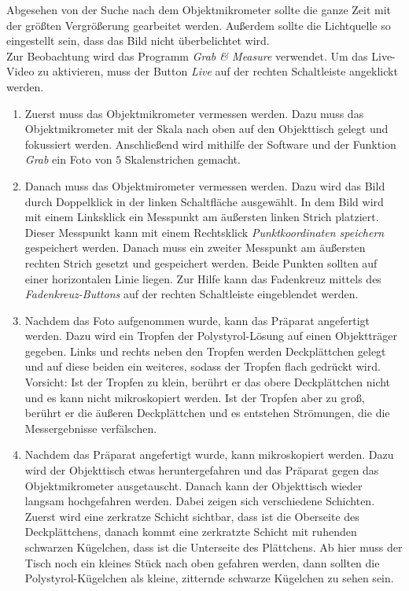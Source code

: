 Abgesehen von der Suche nach dem Objektmikrometer sollte die ganze Zeit mit der größten Vergrößerung gearbeitet werden. Außerdem sollte die Lichtquelle so eingestellt sein, dass das Bild nicht überbelichtet wird. \\
Zur Beobachtung wird das Programm \emph{Grab \& Measure} verwendet. Um das Live-Video zu aktivieren, muss der Button \emph{Live} auf der rechten Schaltleiste angeklickt werden.

\begin{enumerate}

  \item Zuerst muss das Objektmikrometer vermessen werden. Dazu muss das Objektmikrometer mit der Skala nach oben auf den Objekttisch gelegt und fokussiert werden. Anschließend wird mithilfe der Software und der Funktion \emph{Grab} ein Foto von $5$ Skalenstrichen gemacht.

  \item Danach muss das Objektmirometer vermessen werden. Dazu wird das Bild durch Doppelklick in der linken Schaltfläche ausgewählt. In dem Bild wird mit einem Linksklick ein Messpunkt am äußersten linken Strich platziert. Dieser Messpunkt kann mit einem Rechtsklick \emph{Punktkoordinaten speichern} gespeichert werden. Danach muss ein zweiter Messpunkt am äußersten rechten Strich gesetzt und gespeichert werden. Beide Punkten sollten auf einer horizontalen Linie liegen. Zur Hilfe kann das Fadenkreuz mittels des \emph{Fadenkreuz-Buttons} auf der rechten Schaltleiste eingeblendet werden.


  \item Nachdem das Foto aufgenommen wurde, kann das Präparat angefertigt werden. Dazu wird ein Tropfen der Polystyrol-Lösung auf einen Objektträger gegeben. Links und rechts neben den Tropfen werden Deckplättchen gelegt und auf diese beiden ein weiteres, sodass der Tropfen flach gedrückt wird. Vorsicht: Ist der Tropfen zu klein, berührt er das obere Deckplättchen nicht und es kann nicht mikroskopiert werden. Ist der Tropfen aber zu groß, berührt er die äußeren Deckplättchen und es entstehen Strömungen, die die Messergebnisse verfälschen.

  \item Nachdem das Präparat angefertigt wurde, kann mikroskopiert werden. Dazu wird der Objekttisch etwas heruntergefahren und das Präparat gegen das Objektmikrometer ausgetauscht. Danach kann der Objekttisch wieder langsam hochgefahren werden. Dabei zeigen sich verschiedene Schichten. Zuerst wird eine zerkratze Schicht sichtbar, dass ist die Oberseite des Deckplättchens, danach kommt eine zerkratzte Schicht mit ruhenden schwarzen Kügelchen, dass ist die Unterseite des Plättchens. Ab hier muss der Tisch noch ein kleines Stück nach oben gefahren werden, dann sollten die Polystyrol-Kügelchen als kleine, zitternde schwarze Kügelchen zu sehen sein.


\end{enumerate}
